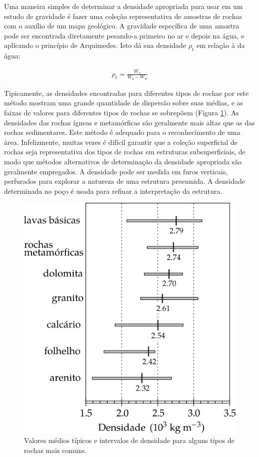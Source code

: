 \documentclass[]{book}
\theoremstyle{definition}
\theoremstyle{definition}
\theoremstyle{definition}
\theoremstyle{remark}
\begin{document}
Uma maneira simples de determinar a densidade apropriada para usar em um estudo de gravidade é fazer uma coleção representativa de amostras de rochas com o auxílio de um mapa geológico. A gravidade específica de uma amostra pode ser encontrada diretamente pesando-a primeiro no ar e depois na água, e aplicando o princípio de Arquimedes. Isto dá sua densidade \(\rho_\mathrm{r}\) em relação à da água:

\begin{align}
\rho_{\mathrm{r}}=\frac{W_{\mathrm{a}}}{W_{\mathrm{a}}-W_{\mathrm{w}}} \label{eq:0245}
\end{align}

Tipicamente, as densidades encontradas para diferentes tipos de rochas por este método mostram uma grande quantidade de dispersão sobre suas médias, e as faixas de valores para diferentes tipos de rochas se sobrepõem (Figura \ref{fig:densidade}). As densidades das rochas ígneas e metamórficas são geralmente mais altas que as das rochas sedimentares. Este método é adequado para o reconhecimento de uma área. Infelizmente, muitas vezes é difícil garantir que a coleção superficial de rochas seja representativa dos tipos de rochas em estruturas subsuperficiais, de modo que métodos alternativos de determinação da densidade apropriada são geralmente empregados. A densidade pode ser medida em furos verticais, perfurados para explorar a natureza de uma estrutura presumida. A densidade determinada no poço é usada para refinar a interpretação da estrutura.

\begin{figure}

{\centering \includegraphics[width=0.6\linewidth]{fig/Fig_02.31} 

}

\caption{Valores médios típicos e intervalos de densidade para alguns tipos de rochas mais comuns.}\label{fig:densidade}
\end{figure}
\end{document}
